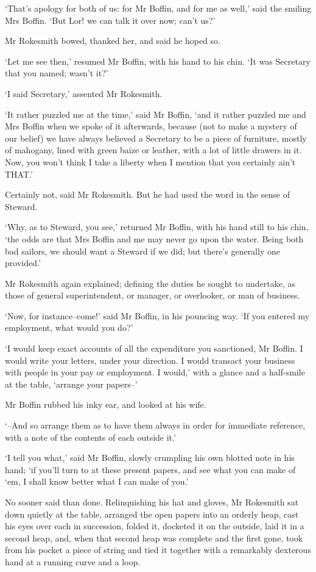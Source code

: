 ‘That’s apology for both of us: for Mr Boffin, and for me as well,’ said
the smiling Mrs Boffin. ‘But Lor! we can talk it over now; can’t us?’

Mr Rokesmith bowed, thanked her, and said he hoped so.

‘Let me see then,’ resumed Mr Boffin, with his hand to his chin. ‘It was
Secretary that you named; wasn’t it?’

‘I said Secretary,’ assented Mr Rokesmith.

‘It rather puzzled me at the time,’ said Mr Boffin, ‘and it rather
puzzled me and Mrs Boffin when we spoke of it afterwards, because (not
to make a mystery of our belief) we have always believed a Secretary to
be a piece of furniture, mostly of mahogany, lined with green baize or
leather, with a lot of little drawers in it. Now, you won’t think I take
a liberty when I mention that you certainly ain’t THAT.’

Certainly not, said Mr Rokesmith. But he had used the word in the sense
of Steward.

‘Why, as to Steward, you see,’ returned Mr Boffin, with his hand still
to his chin, ‘the odds are that Mrs Boffin and me may never go upon the
water. Being both bad sailors, we should want a Steward if we did; but
there’s generally one provided.’

Mr Rokesmith again explained; defining the duties he sought to
undertake, as those of general superintendent, or manager, or
overlooker, or man of business.

‘Now, for instance--come!’ said Mr Boffin, in his pouncing way. ‘If you
entered my employment, what would you do?’

‘I would keep exact accounts of all the expenditure you sanctioned,
Mr Boffin. I would write your letters, under your direction. I would
transact your business with people in your pay or employment. I would,’
with a glance and a half-smile at the table, ‘arrange your papers--’

Mr Boffin rubbed his inky ear, and looked at his wife.

‘--And so arrange them as to have them always in order for immediate
reference, with a note of the contents of each outside it.’

‘I tell you what,’ said Mr Boffin, slowly crumpling his own blotted note
in his hand; ‘if you’ll turn to at these present papers, and see what
you can make of ‘em, I shall know better what I can make of you.’

No sooner said than done. Relinquishing his hat and gloves, Mr Rokesmith
sat down quietly at the table, arranged the open papers into an orderly
heap, cast his eyes over each in succession, folded it, docketed it on
the outside, laid it in a second heap, and, when that second heap was
complete and the first gone, took from his pocket a piece of string and
tied it together with a remarkably dexterous hand at a running curve and
a loop.

